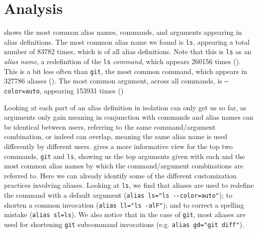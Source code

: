 \section{Analysis}



 shows the most common alias names, commands, and arguments appearing in alias definitions.
The most common alias name we found is \texttt{ls}, appearing a total number of \num{83782} times, which is  of all alias definitions.
Note that this is \texttt{ls} as an \emph{alias name}, a redefinition of the \texttt{ls} \emph{command}, which appears \num{260156} times ().
This is a bit less often than \texttt{git}, the most common command, which appears in \num{327786} aliases ().
The most common argument, across all commands, is \texttt{--color=auto}, appearing \num{153931} times ()



Looking at each part of an alias definition in isolation can only get us so far, as arguments only gain meaning in conjunction with commands and alias names can be identical between users, referring to the same command/argument combination, or indeed can overlap, meaning the same alias name is used differently by different users.
 gives a more informative view for the top two commands, \texttt{git} and \texttt{ls}, showing us the top arguments given with each and the most common alias names by which the command/argument combinations are referred to.
Here we can already identify some of the different customization practices involving aliases.
Looking at \texttt{ls}, we find that aliases are used
to redefine the command with a default argument (\verb|alias ls="ls --color=auto"|);
to shorten a common invocation (\verb|alias ll="ls -alF"|);
and to correct a spelling mistake (\verb|alias sl=ls|).
We also notice that in the case of \texttt{git}, most aliases are used for shortening \texttt{git} subcommand invocations (e.g. \verb|alias gd="git diff"|).

